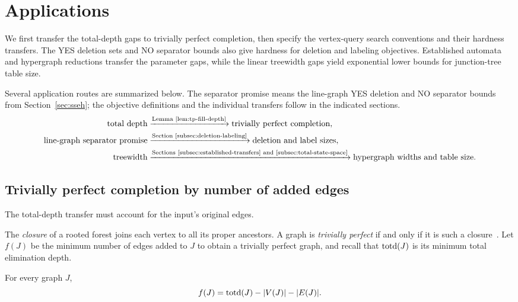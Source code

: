 \section{Applications}
\label{sec:applications}

We first transfer the total-depth gaps to trivially perfect
completion, then specify the vertex-query search conventions and their
hardness transfers. The YES deletion sets and NO separator bounds also
give hardness for deletion and labeling objectives. Established
automata and hypergraph reductions transfer the parameter gaps,
while the linear treewidth gaps yield exponential lower bounds
for junction-tree table size.

Several application routes are summarized below. The separator
promise means the line-graph YES deletion and NO separator bounds
from Section~\ref{sec:sseh}; the objective definitions and the
individual transfers follow in the indicated sections.
\[
\begin{aligned}
 \text{total depth}
 &\xrightarrow{\text{Lemma~\ref{lem:tp-fill-depth}}}
   \text{trivially perfect completion},\\
 \text{line-graph separator promise}
 &\xrightarrow{\text{Section~\ref{subsec:deletion-labeling}}}
   \text{deletion and label sizes},\\
 \text{treewidth}
 &\xrightarrow{\text{Sections~\ref{subsec:established-transfers} and~\ref{subsec:total-state-space}}}
   \text{hypergraph widths and table size}.
\end{aligned}
\]

\subsection{Trivially perfect completion by number of added edges}

The total-depth transfer must account for the input's original edges.

The \emph{closure} of a rooted forest joins each vertex to all its
proper ancestors. A graph is \emph{trivially perfect} if and only if
it is such a closure~\cite[Section~2]{HogemoEtAl2021}. Let $f(J)$ be
the minimum number of edges
added to $J$ to obtain a trivially perfect graph, and recall that
$\operatorname{totd}(J)$ is its minimum total elimination depth.
\begin{lemma}
\label{lem:tp-fill-depth}
For every graph $J$,
\begin{equation}\label{eq:tp-fill-depth}
 f(J)=\operatorname{totd}(J)-|V(J)|-|E(J)|.
\end{equation}
\end{lemma}

